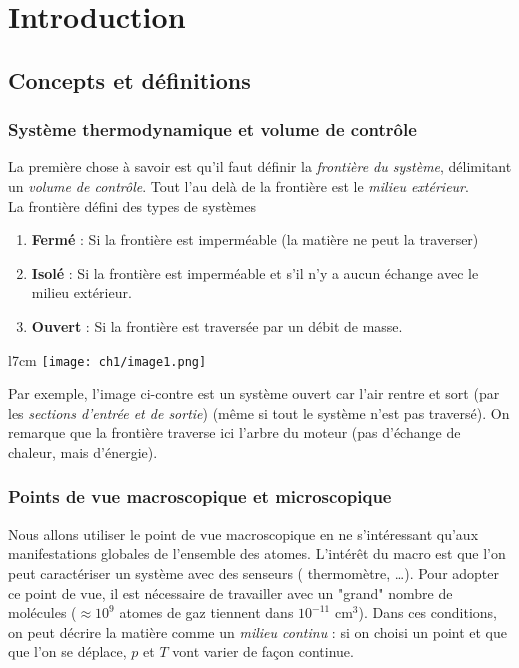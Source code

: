 \chapter{Introduction} 

\setcounter{section}{1}
\section{Concepts et définitions}
\subsection{Système thermodynamique et volume de contrôle}
La première chose à savoir est qu'il faut définir la \textit{frontière 
	du système}, délimitant un \textit{volume de contrôle}. Tout l'au delà 
de la frontière est le \textit{milieu extérieur}.\\
	
La frontière défini des types de systèmes
\begin{enumerate}
	\item \textbf{Fermé} : Si la frontière est imperméable (la matière ne 
	      peut la traverser)
	\item \textbf{Isolé} : Si la frontière est imperméable et s'il n'y a 
	      aucun échange avec le milieu extérieur.
	\item \textbf{Ouvert} : Si la frontière est traversée par un débit de 
	      masse.
\end{enumerate}
	
\begin{wrapfigure}[6]{l}{7cm}
	\vspace{-6mm}
	\texttt{[image: ch1/image1.png]}
\end{wrapfigure}
Par exemple, l'image ci-contre est un système ouvert car l'air 
rentre et sort (par les \textit{sections d'entrée et de sortie}) (même 
si tout le système n'est pas traversé). On remarque que la frontière 
traverse ici l'arbre du moteur (pas d'échange de chaleur, mais 
d'énergie).
	
	
\subsection{Points de vue macroscopique et microscopique}
Nous allons utiliser le point de vue macroscopique en ne s'intéressant  
qu'aux manifestations globales de l'ensemble des atomes. L'intérêt du 
macro est que l'on peut caractériser un système avec des senseurs (
thermomètre, \dots). Pour adopter ce point de vue, il est nécessaire 
de travailler avec un "grand" nombre de molécules ($\approx 10^9$ atomes 
de gaz tiennent dans $10^{-11}$ cm$^3$). Dans ces conditions, on peut 
décrire la matière comme un \textit{milieu continu} : si on choisi un 
point et que que l'on se déplace, $p$ et $T$ vont varier de façon 
continue.
	
